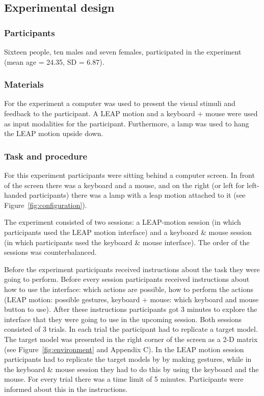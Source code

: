 \subsection{Experimental design}
\subsubsection{Participants}
Sixteen people, ten males and seven females, participated in the experiment (mean age = 24.35, SD = 6.87). 
\subsubsection{Materials}
For the experiment a computer was used to present the visual stimuli and feedback to the participant. A LEAP motion and a keyboard + mouse were used as input modalities for the participant. Furthermore, a lamp was used to hang the LEAP motion upside down.
\subsubsection{Task and procedure}
For this experiment participants were sitting behind a computer screen. In front of the screen there was a keyboard and a mouse, and on the right (or left for left-handed participants) there was a lamp with a leap motion attached to it (see Figure~\ref{fig:configuration}).

The experiment consisted of two sessions: a LEAP-motion session (in which participants used the LEAP motion interface) and a keyboard \& mouse session (in which participants used the keyboard \& mouse interface). The order of the sessions was counterbalanced.

Before the experiment participants received instructions about the task they were going to perform. Before every session participants received instructions about how to use the interface: which actions are possible, how to perform the actions (LEAP motion: possible gestures, keyboard + mouse: which keyboard and mouse button to use). After these instructions participants got 3 minutes to explore the interface that they were going to use in the upcoming session. 
Both sessions consisted of 3 trials. In each trial the participant had to replicate a target model. The target model was presented in the right corner of the screen as a 2-D matrix (see Figure~\ref{fig:environment} and Appendix C). In the LEAP motion session participants had to replicate the target models by by making gestures, while in the keyboard \& mouse session they had to do this by using the keyboard and the mouse. For every trial there was a time limit of 5 minutes. Participants were informed about this in the instructions.

